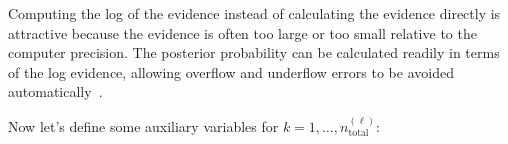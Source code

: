 Computing the log of the evidence instead of calculating the evidence directly is attractive because the evidence
is often too large or too small relative to the computer precision.
%
The posterior probability can be calculated readily in terms of the
log evidence, allowing overflow and underflow errors to be avoided
automatically~\cite{ChOlPr10}.  



Now let's define some auxiliary variables for $k=1,\ldots,n_\text{total}^{(\ell)}$:
    
